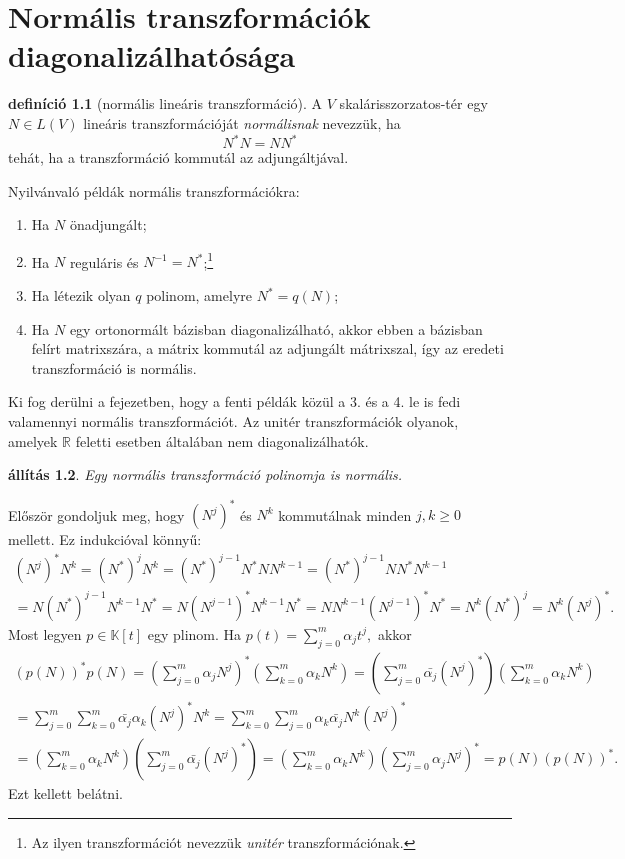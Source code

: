 \documentclass[a4paper, showtrims]{memoir}
\makeatletter
\renewenvironment{proof}[1][\proofname]
    {\par\pushQED{\qed}%
    \normalfont \topsep6\p@\@plus6\p@\relax
    \trivlist
    \item[\hskip\labelsep
        \itshape
    #1\@addpunct{:}]\ignorespaces}
    {\popQED\endtrivlist\@endpefalse}
\theoremstyle{plain}
\newtheorem{proposition}{állítás}[chapter]
\theoremstyle{remark}
\theoremstyle{definition}
\newtheorem{definition}[proposition]{definíció}
\makeatother
\begin{document}
\chapter{Normális transzformációk diagonalizálhatósága}
\begin{definition}[normális lineáris transzformáció]
	A $V$ skalárisszorzatos-tér egy $N\in L\left( V \right)$ lineáris transzformációját
	\emph{normálisnak} nevezzük,
	ha $$N^\ast N=NN^\ast$$ tehát, ha a transzformáció kommutál az adjungáltjával.
\end{definition}
Nyilvánvaló példák normális transzformációkra:
\begin{enumerate}
	\item Ha $N$ önadjungált;
	\item Ha $N$ reguláris és $N^{-1}=N^\ast$;\footnote{Az ilyen transzformációt nevezzük
		      \emph{unitér}
		      transzformációnak.}
	\item Ha létezik olyan $q$ polinom, amelyre $N^\ast=q\left( N \right)$;
	\item
	      Ha $N$ egy ortonormált bázisban diagonalizálható, akkor
	      ebben a bázisban felírt matrixszára, a mátrix kommutál az adjungált mátrixszal,
	      így az eredeti transzformáció is normális.
\end{enumerate}
Ki fog derülni a fejezetben, hogy a fenti példák közül a 3. és a 4. le is fedi valamennyi normális transzformációt.
Az unitér transzformációk olyanok, amelyek $\mathbb{R}$ feletti esetben általában nem diagonalizálhatók.
\begin{proposition}
	Egy normális transzformáció polinomja is normális.
\end{proposition}
\begin{proof}
	Először gondoljuk meg, hogy $(N^j)^\ast$ és $N^k$ kommutálnak minden $j,k≥0$ mellett.
	Ez indukcióval könnyű:
	\begin{multline*}
		(N^j)^\ast N^k
		=
		(N^\ast)^jN^k
		=
		(N^\ast)^{j-1}N^\ast NN^{k-1}
		=
		(N^\ast)^{j-1}NN^\ast N^{k-1}
		\\
		=
		N(N^\ast)^{j-1}N^{k-1}N^\ast
		=
		N(N^{j-1})^\ast N^{k-1}N^\ast
		=
		NN^{k-1}(N^{j-1})^\ast N^\ast
		=
		N^k(N^\ast)^j
		=
		N^k(N^j)^\ast.
	\end{multline*}
	Most legyen $p\in \mathbb{K}[t]$ egy plinom.
	Ha $p\left( t \right)=\sum_{j=0}^m\alpha_jt^j,$
	akkor
	\begin{multline*}
		\left( p\left( N \right) \right)^\ast p\left( N \right)
		=
		\left( \sum_{j=0}^m\alpha_jN^j \right)^\ast
		\left( \sum_{k=0}^m\alpha_kN^k \right)
		=
		\left( \sum_{j=0}^m\bar{\alpha_j}(N^j)^\ast \right)
		\left( \sum_{k=0}^m\alpha_kN^k \right)
		\\
		=
		\sum_{j=0}^m\sum_{k=0}^m\bar{\alpha_j}\alpha_k(N^j)^\ast N^k
		=
		\sum_{k=0}^m\sum_{j=0}^m\alpha_k\bar{\alpha_j}N^k(N^j)^\ast
		\\
		=
		\left( \sum_{k=0}^m\alpha_kN^k \right)
		\left( \sum_{j=0}^m\bar{\alpha_j}(N^j)^\ast \right)
		=
		\left( \sum_{k=0}^m\alpha_kN^k \right)
		\left( \sum_{j=0}^m\alpha_jN^j\right)^\ast
		=
		p\left( N \right)\left( p\left( N \right) \right)^\ast.
	\end{multline*}
	Ezt kellett belátni.
\end{proof}
\end{document}
